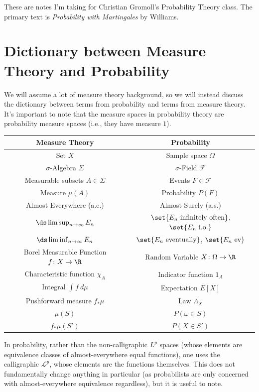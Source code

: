 \documentclass[10pt]{mypackage}
\begin{document}
\RaggedRight
These are notes I'm taking for Christian Gromoll's Probability Theory class. The primary text is \textit{Probability with Martingales} by Williams.
\section{Dictionary between Measure Theory and Probability}%
We will assume a lot of measure theory background, so we will instead discuss the dictionary between terms from probability and terms from measure theory. It's important to note that the measure spaces in probability theory are probability measure spaces (i.e., they have measure $1$).
\begin{center}
  \renewcommand{\arraystretch}{1.5}
  \begin{tabular}{c|c}
    Measure Theory & Probability\\
    \hline
    Set $X$ & Sample space $\Omega$\\
    $\sigma$-Algebra $\Sigma$ & $\sigma$-Field $\mathcal{F}$\\
    Measurable subsets $A\in \Sigma$ & Events $F\in \mathcal{F}$\\
    Measure $\mu(A)$ & Probability $P(F)$\\
    Almost Everywhere (a.e.) & Almost Surely (a.s.)\\
    $\ds \limsup_{n\rightarrow\infty} E_n$ & $\set{E_n\text{ infinitely often}}$, $\set{E_n\text{ i.o.}}$\\
    $\ds \liminf_{n\rightarrow\infty} E_n$ & $\set{E_n\text{ eventually}}$, $ \set{E_n\text{ ev}} $\\
    Borel Measurable Function $f\colon X\rightarrow \R$ & Random Variable $X\colon \Omega\rightarrow \R$\\
    Characteristic function $\chi_A$ & Indicator function $1_A$\\
    Integral $ \int_{}^{} f\:d\mu $ & Expectation $E[X]$\\
    Pushforward measure $f_{\ast}\mu$ & Law $\Lambda_X$\\
    $\mu\left( S \right)$ & $P\left( \omega\in S \right)$\\
    $f_{\ast}\mu\left( S' \right)$ & $P\left( X\in S' \right)$\\
    \hline
  \end{tabular}
\end{center}
\begin{remark}
  In probability, rather than the non-calligraphic $L^p$ spaces (whose elements are equivalence classes of almost-everywhere equal functions), one uses the calligraphic $\mathcal{L}^p$, whose elements are the functions themselves. This does not fundamentally change anything in particular (as probabilists are only concerned with almost-everywhere equivalence regardless), but it is useful to note.
\end{remark}
\end{document}
